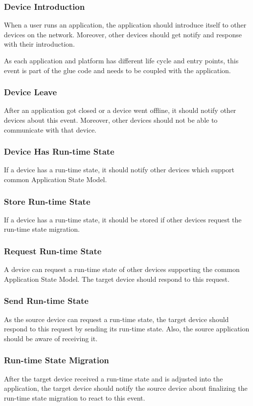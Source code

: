 \subsubsection{Device Introduction}
When a user runs an application, the application should introduce itself to other devices on the network. Moreover, other devices should get notify and response with their introduction.

As each application and platform has different life cycle and entry points, this event is part of the glue code and needs to be coupled with the application.

\subsubsection{Device Leave}
After an application got closed or a device went offline, it should notify other devices about this event. Moreover, other devices should not be able to communicate with that device.

\subsubsection{Device Has Run-time State}
If a device has a run-time state, it should notify other devices which support  common Application State Model.

\subsubsection{Store Run-time State}
If a device has a run-time state, it should be stored if other devices request the run-time state migration.

\subsubsection{Request Run-time State}
A device can request a run-time state of other devices supporting the common Application State Model. The target device should respond to this request.

\subsubsection{Send Run-time State}
As the source device can request a run-time state, the target device should respond to this request by sending its run-time state. Also, the source application should be aware of receiving it.

\subsubsection{Run-time State Migration}
After the target device received a run-time state and is adjusted into the application, the target device should notify the source device about finalizing the run-time state migration to react to this event.


